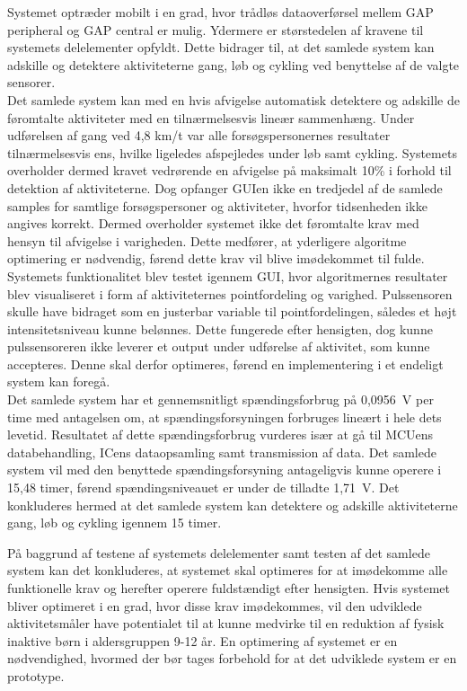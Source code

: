 Systemet optræder  mobilt i en grad, hvor trådløs dataoverførsel mellem GAP peripheral og GAP central er mulig. Ydermere er størstedelen af kravene til systemets delelementer opfyldt. Dette bidrager til, at det samlede system kan adskille og detektere aktiviteterne gang, løb og cykling ved benyttelse af de valgte sensorer. \\
Det samlede system kan med en hvis afvigelse automatisk detektere og adskille de føromtalte aktiviteter med en tilnærmelsesvis lineær sammenhæng. Under udførelsen af gang ved 4,8 km/t var alle forsøgspersonernes resultater tilnærmelsesvis ens, hvilke ligeledes afspejledes under løb samt cykling. Systemets overholder dermed kravet vedrørende en afvigelse på maksimalt 10\% i forhold til detektion af aktiviteterne. Dog opfanger GUIen ikke en tredjedel af de samlede samples for samtlige forsøgspersoner og aktiviteter, hvorfor tidsenheden ikke angives korrekt. Dermed overholder systemet ikke det føromtalte krav med hensyn til afvigelse i varigheden. Dette medfører, at yderligere algoritme optimering er nødvendig, førend dette krav vil blive imødekommet til fulde. \\
Systemets funktionalitet blev testet igennem GUI, hvor algoritmernes resultater blev visualiseret i form af aktiviteternes pointfordeling og varighed. Pulssensoren skulle have bidraget som en justerbar variable til pointfordelingen, således et højt intensitetsniveau kunne belønnes. Dette fungerede efter hensigten, dog kunne pulssensoreren ikke leverer et output under udførelse af aktivitet, som kunne accepteres. Denne skal derfor optimeres, førend en implementering i et endeligt system kan foregå. \\
Det samlede system har et gennemsnitligt spændingsforbrug på 0,0956~V per time med antagelsen om, at spændingsforsyningen forbruges lineært i hele dets levetid. Resultatet af dette spændingsforbrug vurderes især at gå til MCUens databehandling, ICens dataopsamling samt transmission af data. Det samlede system vil med den benyttede spændingsforsyning antageligvis kunne operere i 15,48 timer, førend spændingsniveauet er under de tilladte 1,71~V. Det konkluderes hermed at det samlede system kan detektere og adskille aktiviteterne gang, løb og cykling igennem 15 timer. 

På baggrund af testene af systemets delelementer samt testen af det samlede system kan det konkluderes, at systemet skal optimeres for at imødekomme alle funktionelle krav og herefter operere fuldstændigt efter hensigten. Hvis systemet bliver optimeret i en grad, hvor disse krav imødekommes, vil den udviklede aktivitetsmåler have potentialet til at kunne medvirke til en reduktion af fysisk inaktive børn i aldersgruppen 9-12 år. En optimering af systemet er en nødvendighed, hvormed der bør tages forbehold for at det udviklede system er en prototype.%